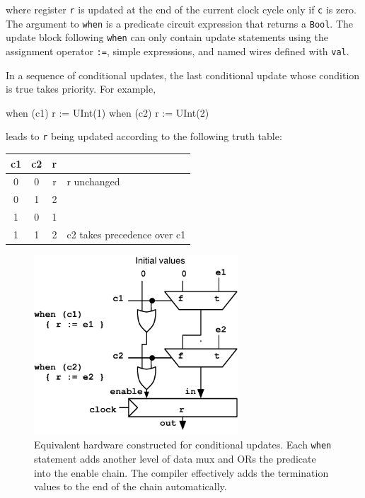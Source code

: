 \documentclass[twocolumn,10pt]{article}
\def\code#1{{\tt #1}}
\begin{document}
\noindent
where register \code{r} is updated at the end of the current clock
cycle only if \verb+c+ is zero.  The argument to \code{when} is a
predicate circuit expression that returns a \code{Bool}.  The update
block following \code{when} can only contain update statements using
the assignment operator \verb+:=+, simple expressions, and named wires
defined with \code{val}.

In a sequence of conditional updates, the last conditional update
whose condition is true takes priority.  For example,
\begin{scala}
when (c1) { r := UInt(1) }
when (c2) { r := UInt(2) }
\end{scala}

\noindent
leads to \code{r} being updated according to the following truth table:
\begin{center}
{\small
\begin{tabular}{|c|c|c|l|}
\hline
c1 & c2  &  r & \\
\hline
0 &  0 & r &  r unchanged \\
0 &  1 & 2 & \\
1 &  0 & 1 & \\
1 &  1 & 2& c2 takes precedence over c1 \\
\hline
\end{tabular}
}
\end{center}

\begin{figure}[h]
\centering
\includegraphics[width=3in]{figs/condupdates.pdf}
\caption{Equivalent hardware constructed for conditional updates.
  Each \code{when} statement adds another level of data mux and ORs
  the predicate into the enable chain.  The compiler effectively adds
  the termination values to the end of the chain automatically.}
\label{fig:condupdates}
\end{figure}
\end{document}
